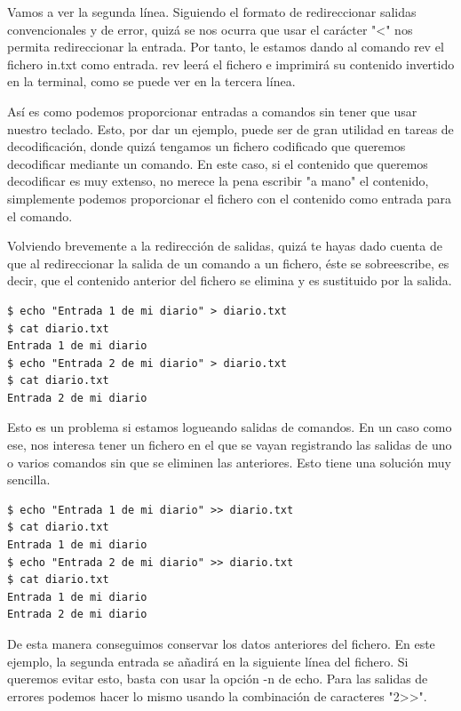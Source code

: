 Vamos a ver la segunda línea. Siguiendo el formato de redireccionar salidas convencionales y de error, quizá se nos ocurra que usar el carácter "<" nos permita redireccionar la entrada. Por tanto, le estamos dando al comando rev el fichero in.txt como entrada. rev leerá el fichero e imprimirá su contenido invertido en la terminal, como se puede ver en la tercera línea. 

Así es como podemos proporcionar entradas a comandos sin tener que usar nuestro teclado. Esto, por dar un ejemplo, puede ser de gran utilidad en tareas de decodificación, donde quizá tengamos un fichero codificado que queremos decodificar mediante un comando. En este caso, si el contenido que queremos decodificar es muy extenso, no merece la pena escribir "a mano" el contenido, simplemente podemos proporcionar el fichero con el contenido como entrada para el comando.

Volviendo brevemente a la redirección de salidas, quizá te hayas dado cuenta de que al redireccionar la salida de un comando a un fichero, éste se sobreescribe, es decir, que el contenido anterior del fichero se elimina y es sustituido por la salida. 

\begin{tcolorbox-code}
\begin{lstlisting}
$ echo "Entrada 1 de mi diario" > diario.txt
$ cat diario.txt
Entrada 1 de mi diario
$ echo "Entrada 2 de mi diario" > diario.txt
$ cat diario.txt
Entrada 2 de mi diario
\end{lstlisting}
\end{tcolorbox-code}

Esto es un problema si estamos logueando salidas de comandos. En un caso como ese, nos interesa tener un fichero en el que se vayan registrando las salidas de uno o varios comandos sin que se eliminen las anteriores. Esto tiene una solución muy sencilla.

\begin{tcolorbox-code}
\begin{lstlisting}
$ echo "Entrada 1 de mi diario" >> diario.txt
$ cat diario.txt
Entrada 1 de mi diario
$ echo "Entrada 2 de mi diario" >> diario.txt
$ cat diario.txt
Entrada 1 de mi diario
Entrada 2 de mi diario
\end{lstlisting}
\end{tcolorbox-code}

De esta manera conseguimos conservar los datos anteriores del fichero. En este ejemplo, la segunda entrada se añadirá en la siguiente línea del fichero. Si queremos evitar esto, basta con usar la opción -n de echo. Para las salidas de errores podemos hacer lo mismo usando la combinación de caracteres "2>>".

